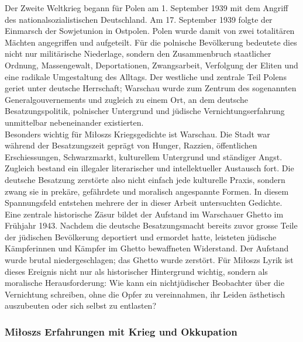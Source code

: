 Der Zweite Weltkrieg begann für Polen am 1. September 1939 mit dem Angriff des nationalsozialistischen Deutschland. Am 17. September 1939 folgte der Einmarsch der Sowjetunion in Ostpolen. Polen wurde damit von zwei totalitären Mächten angegriffen und aufgeteilt. Für die polnische Bevölkerung bedeutete dies nicht nur militärische Niederlage, sondern den Zusammenbruch staatlicher Ordnung, Massengewalt, Deportationen, Zwangsarbeit, Verfolgung der Eliten und eine radikale Umgestaltung des Alltags. Der westliche und zentrale Teil Polens geriet unter deutsche Herrschaft; Warschau wurde zum Zentrum des sogenannten Generalgouvernements und zugleich zu einem Ort, an dem deutsche Besatzungspolitik, polnischer Untergrund und jüdische Vernichtungserfahrung unmittelbar nebeneinander existierten.
\\[6pt]
Besonders wichtig für Miłoszs Kriegsgedichte ist Warschau. Die Stadt war während der Besatzungszeit geprägt von Hunger, Razzien, öffentlichen Erschiessungen, Schwarzmarkt, kulturellem Untergrund und ständiger Angst. Zugleich bestand ein illegaler literarischer und intellektueller Austausch fort. Die deutsche Besatzung zerstörte also nicht einfach jede kulturelle Praxis, sondern zwang sie in prekäre, gefährdete und moralisch angespannte Formen. In diesem Spannungsfeld entstehen mehrere der in dieser Arbeit untersuchten Gedichte.
\\[6pt]
Eine zentrale historische Zäsur bildet der Aufstand im Warschauer Ghetto im Frühjahr 1943. Nachdem die deutsche Besatzungsmacht bereits zuvor grosse Teile der jüdischen Bevölkerung deportiert und ermordet hatte, leisteten jüdische Kämpferinnen und Kämpfer im Ghetto bewaffneten Widerstand. Der Aufstand wurde brutal niedergeschlagen; das Ghetto wurde zerstört. Für Miłoszs Lyrik ist dieses Ereignis nicht nur als historischer Hintergrund wichtig, sondern als moralische Herausforderung: Wie kann ein nichtjüdischer Beobachter über die Vernichtung schreiben, ohne die Opfer zu vereinnahmen, ihr Leiden ästhetisch auszubeuten oder sich selbst zu entlasten?

\subsubsection{Miłoszs Erfahrungen mit Krieg und Okkupation}

